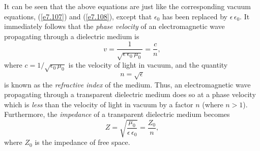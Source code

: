 It can be seen that the above equations are just like the corresponding vacuum equations,
(\ref{e7.107}) and (\ref{e7.108}), except that $\epsilon_0$ has been replaced by
$\epsilon\,\epsilon_0$. It immediately follows that the {\em phase velocity}\/ of an
electromagnetic wave propagating through a dielectric medium is
\begin{equation}
v = \frac{1}{\sqrt{\epsilon\,\epsilon_0\,\mu_0}} = \frac{c}{n},
\end{equation}
where $c=1/\sqrt{\epsilon_0\,\mu_0}$ is the velocity of light in vacuum, and
the quantity
\begin{equation}
n = \sqrt{\epsilon}
\end{equation}
is known as the {\em refractive index}\/ of the medium. Thus, an electromagnetic
wave propagating through a transparent dielectric medium does so at a
phase velocity which is {\em less}\/ than the velocity of light in vacuum by a
factor $n$ (where $n>1$). Furthermore, the {\em impedance}\/ of a transparent dielectric medium becomes
\begin{equation}
Z = \sqrt{\frac{\mu_0}{\epsilon\,\epsilon_0}} = \frac{Z_0}{n},
\end{equation}
where $Z_0$ is the impedance of free space.

